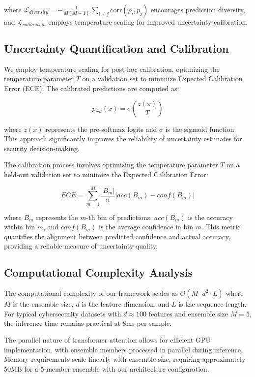 \documentclass[journal]{IEEEtran}
\begin{document}
where $\mathcal{L}_{diversity} = -\frac{1}{M(M-1)} \sum_{i \neq j} \text{corr}(p_i, p_j)$ encourages prediction diversity, and $\mathcal{L}_{calibration}$ employs temperature scaling for improved uncertainty calibration.

\subsection{Uncertainty Quantification and Calibration}

We employ temperature scaling for post-hoc calibration, optimizing the temperature parameter $T$ on a validation set to minimize Expected Calibration Error (ECE). The calibrated predictions are computed as:

\begin{equation}
p_{cal}(x) = \sigma(\frac{z(x)}{T})
\end{equation}

where $z(x)$ represents the pre-softmax logits and $\sigma$ is the sigmoid function. This approach significantly improves the reliability of uncertainty estimates for security decision-making.

The calibration process involves optimizing the temperature parameter $T$ on a held-out validation set to minimize the Expected Calibration Error:

\begin{equation}
ECE = \sum_{m=1}^M \frac{|B_m|}{n} |acc(B_m) - conf(B_m)|
\end{equation}

where $B_m$ represents the $m$-th bin of predictions, $acc(B_m)$ is the accuracy within bin $m$, and $conf(B_m)$ is the average confidence in bin $m$. This metric quantifies the alignment between predicted confidence and actual accuracy, providing a reliable measure of uncertainty quality.

\subsection{Computational Complexity Analysis}

The computational complexity of our framework scales as $O(M \cdot d^2 \cdot L)$ where $M$ is the ensemble size, $d$ is the feature dimension, and $L$ is the sequence length. For typical cybersecurity datasets with $d \approx 100$ features and ensemble size $M=5$, the inference time remains practical at 8ms per sample.

The parallel nature of transformer attention allows for efficient GPU implementation, with ensemble members processed in parallel during inference. Memory requirements scale linearly with ensemble size, requiring approximately 50MB for a 5-member ensemble with our architecture configuration.
\end{document}
